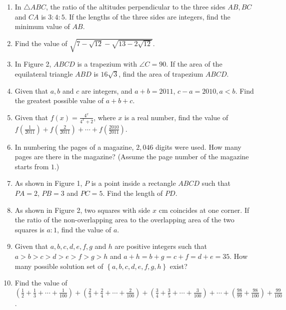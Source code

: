 \documentclass{article}
\begin{document}
\begin{enumerate}
    \item
        In $\triangle ABC$, the ratio of the altitudes perpendicular to the three sides $AB,BC$ and $CA$ is $3:4:5$. If the lengths of the three sides are integers, find the minimum value of $AB$.
    \item
        Find the value of $\sqrt{7-\sqrt{12}-\sqrt{13-2\sqrt{12}}}$.
    \item
        In Figure 2,  $ABCD$ is a trapezium with $\angle C=90$. If the area of the equilateral triangle  $ABD$  is $16\sqrt{3}$, find the area of trapezium $ABCD$.
    \item
        Given that  $a,b$ and $c$ are integers, and $a + b = 2011$, $c-a = 2010,  a < b$. Find the greatest possible value of $a + b + c$.
    \item
        Given that $f(x)=\frac{4^{x}}{4^{x}+2}$, where $x$ is a real number, find the value of\\
        $f(\frac{1}{2011})+f(\frac{2}{2011})+\cdots+f(\frac{2010}{2011})$.
    \item
        In numbering the pages of a magazine, $2,046$ digits were used. How many pages are there in the magazine? (Assume the page number of the magazine starts from $1$.)
    \item
        As shown in Figure 1, $P$ is a point inside a rectangle $ABCD$ such that $PA = 2$, $PB = 3$ and $PC = 5$. Find the length of $PD$.
    \item
        As  shown  in  Figure  2,  two  squares  with  side  $x$  cm  coincides  at  one  corner.  If  the  ratio  of  the  non-overlapping area to the overlapping area of the two squares is $a : 1$, find the value of $a$.
    \item
        Given that  $a ,  b ,  c ,  d ,  e ,  f ,  g$  and  $h$  are positive integers such that $a>b>c>d>e>f>g>h$ and $a+h=b+g=c+f=d+e=35$. How many possible solution set of $\left\{a,b,c,d,e,f,g,h\right\}$ exist?
    \item
        Find the value of $\left(\frac{1}{2}+\frac{1}{3}+\cdots+\frac{1}{100}\right)+\left(\frac{2}{3}+\frac{2}{4}+\cdots+\frac{2}{100}\right)+\left(\frac{3}{4}+\frac{3}{5}+\cdots+\frac{3}{100}\right)+\cdots+\left(\frac{98}{99}+\frac{98}{100}\right)+\frac{99}{100}$.
\end{enumerate}
\end{document}
